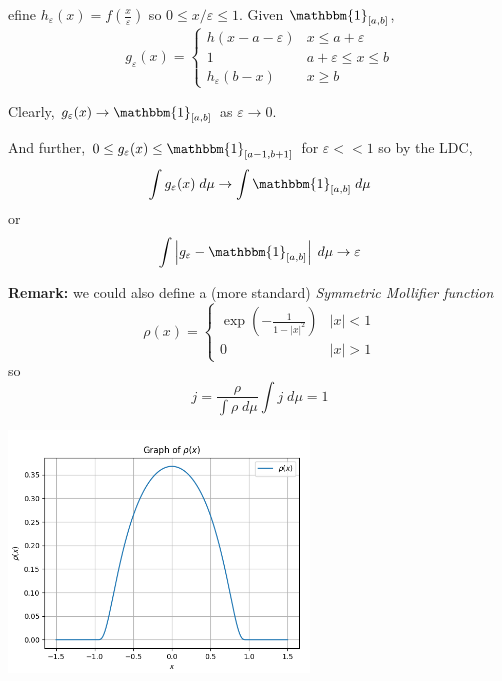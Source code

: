 \documentclass[12pt]{report}
\newcommand{\ind}{\mathbbm{1}}
\newcommand{\abs}[1]{\left\vert #1 \right\vert}
\newcommand{\ep}{\varepsilon}
\newcommand*{\tbf}[1]{\ifmmode\mathbf{#1}\else\textbf{#1}\fi}
\newenvironment*{tbox}[2][gray]{
    \begin{tcolorbox}[
        parbox=false,
        colback=#1!5!white,
        colframe=#1!75!black,
        breakable,
        title={#2}
    ]}
    {\end{tcolorbox}}
\begin{document}
\begin{tbox}
            Define $h_{\ep}(x) = f(\frac{x}{\ep})$ so $0 \leq x/\ep \leq 1$. Given $\ind_{[a, b]}$, 
            \[g_{\ep}(x) = \begin{cases}
                h(x - a - \ep) & x \leq a + \ep\\
                1 & a + \ep \leq x \leq b\\ 
                h_{\ep}(b - x) & x \geq b
            \end{cases}\]

            Clearly, $g_{\ep}(x) \to \ind_{[a,b]}$ as $\ep \to 0$.  

            And further, $0 \leq g_{\ep}(x) \leq \ind_{[a - 1, b+ 1]}$ for $\ep << 1$ so by the LDC, 
            \[\int g_{\ep}(x) \; d\mu \to \int \ind_{[a, b]} \; d\mu\] 
            or 
            \[\int \abs{g_{\ep} - \ind_{[a, b]}} \; d\mu \to \ep \]
        \end{tbox}

        \tbf{Remark:} we could also define a (more standard) \emph{Symmetric Mollifier function}
        \[\rho(x) = \begin{cases}
            \exp(- \frac{1}{1 - \abs{x}^2}) & \abs{x} < 1\\ 
            0 & \abs{x} > 1
        \end{cases}\]
        so 
        \[j = \frac{\rho}{ \int \rho \; d\mu} \int j \; d\mu = 1\]

        \begin{center}
            \includegraphics[width=0.6\textwidth]{Images/symmetric mollifier.png}
        \end{center}
\end{document}
